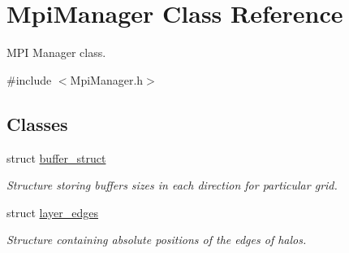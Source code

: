 \hypertarget{class_mpi_manager}{}\section{Mpi\+Manager Class Reference}
\label{class_mpi_manager}


M\+PI Manager class.  




{\ttfamily \#include $<$Mpi\+Manager.\+h$>$}

\subsection*{Classes}
\begin{DoxyCompactItemize}
\item 
struct \hyperlink{struct_mpi_manager_1_1buffer__struct}{buffer\+\_\+struct}
\begin{DoxyCompactList}\small\item\em Structure storing buffers sizes in each direction for particular grid. \end{DoxyCompactList}\item 
struct \hyperlink{struct_mpi_manager_1_1layer__edges}{layer\+\_\+edges}
\begin{DoxyCompactList}\small\item\em Structure containing absolute positions of the edges of halos. \end{DoxyCompactList}\end{DoxyCompactItemize}
